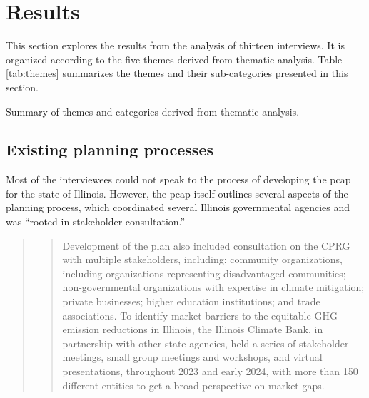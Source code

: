 \section{Results}
\label{section:interview-results}
This section explores the results from the analysis of thirteen interviews. It
is organized according to the five themes derived from thematic analysis. Table
\ref{tab:themes} summarizes the themes and their sub-categories presented in
this section.

\begin{table}[ht!]
    \centering
    \caption{Summary of themes and categories derived from thematic analysis.}
    \label{tab:themes}
    
\end{table}
\FloatBarrier

\subsection{Existing planning processes}
\label{section:planning-processes}
Most of the interviewees could not speak to the process of developing the
\acf{pcap} for the state of Illinois. However, the \ac{pcap} itself outlines
several aspects of the planning process, which coordinated several Illinois
governmental agencies and was ``rooted in stakeholder consultation.''

\begin{quote}
    \blockcquote[10]{kibbey_state_2024}{Development of the plan also included
    consultation on the CPRG with multiple stakeholders, including: community
    organizations, including organizations representing disadvantaged
    communities; non-governmental organizations with expertise in climate
    mitigation; private businesses; higher education institutions; and trade
    associations. To identify market barriers to the equitable GHG emission
    reductions in Illinois, the Illinois Climate Bank, in partnership with other
    state agencies, held a series of stakeholder meetings, small group meetings
    and workshops, and virtual presentations, throughout 2023 and early 2024,
    with more than 150 different entities to get a broad perspective on market
    gaps.}
\end{quote}

